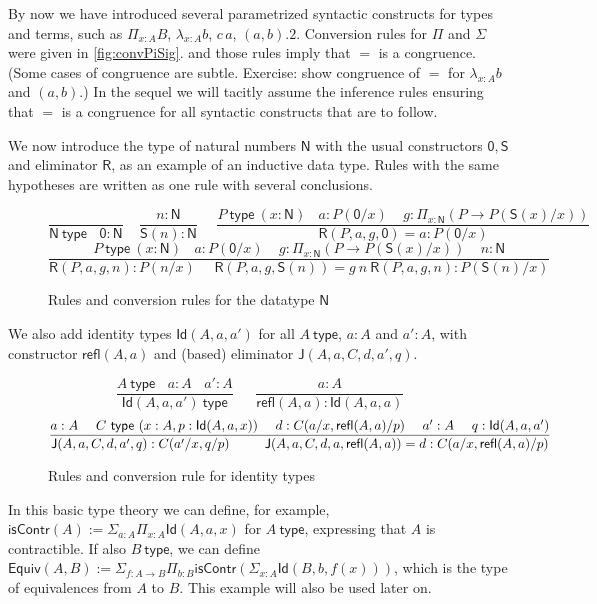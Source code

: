 \documentclass[11pt,a4paper]{article}
\theoremstyle{definition}
\newcommand{\Id}{\mathsf{Id}}
\newcommand{\NN}{\mathsf{N}}
\newcommand{\JJ}{\mathsf{J}}
\newcommand{\ZERO}{\mathsf{0}}
\newcommand{\SUCC}{\mathsf{S}}
\newcommand{\type}{\mathsf{type}}
\newcommand{\mylam}[3]{\lambda_{#1:#2}#3}
\newcommand{\mypi}[3]{\Pi_{#1:#2}#3}
\newcommand{\mysig}[3]{\Sigma_{#1:#2}#3}
\newcommand{\app}[2]{{#1\,#2}} %
\newcommand{\Sapp}[1]{\sapp{\SUCC}{#1}}
\newcommand{\sapp}[2]{{#1(#2)}} %
\newcommand{\Idapp}[3]{\sapp{\Id}{#1,#2,#3}}
\newcommand{\NRapp}[4]{\sapp{\RR}{#1,#2,#3,#4}}
\newcommand{\Rfapp}[2]{\sapp{\refl}{#1,#2}}
\newcommand{\Japp}[6]{\sapp{\JJ}{#1,#2,#3,#4,#5,#6}}
\newcommand{\RR}{\mathsf{R}}
\newcommand{\Equiv}{\mathsf{Equiv}}
\newcommand{\isContr}{\mathsf{isContr}}
\newcommand{\refl}{\mathsf{refl}}
\begin{document}
By now we have introduced several parametrized syntactic constructs
for types and terms, such as $\mypi{x}{A}{B}$,
$\mylam{x}{A}{b}$, $\app{c}{a}$, $(a,b).2$.
Conversion rules for $\Pi$ and $\Sigma$ were given in \cref{fig:convPiSig}.
and those rules imply that $=$ is a congruence.%
(Some cases of congruence are subtle. Exercise:
show congruence of $=$ for $\mylam{x}{A}{b}$ and $(a,b)$.)
In the sequel we will tacitly assume the inference rules
ensuring that $=$ is a congruence for all syntactic constructs
that are to follow.

We now introduce the type of natural numbers $\NN$ with
the usual constructors $\ZERO,\SUCC$ and eliminator $\RR$,
as an example of an inductive data type.
Rules with the same hypotheses are written as one rule with
several conclusions.

\begin{figure}[H]
  \caption{Rules and conversion rules for the datatype $\NN$}\label{fig:typeN}
$$
\frac{}{\NN~\type~~~~\ZERO:\NN}~~~~~
\frac{n:\NN}{\Sapp{n} : \NN}~~~~~~
\frac{P~\type~(x:\NN)~~~~a:P(\ZERO/x)~~~~~
g:\mypi{x}{\NN}{(P\to P(\Sapp{x}/x))}}
{\NRapp{P}{a}{g}{\ZERO} = a: P(\ZERO/x) }
$$
$$
\frac{P~\type~(x:\NN)~~~~a:P(\ZERO/x)~~~~~
g:\mypi{x}{\NN}{(P\to P(\Sapp{x}/x))}~~~~~n:\NN}
{\NRapp{P}{a}{g}{n}:P(n/x)~~~~~~\NRapp{P}{a}{g}{\Sapp{n}} = g~n~\NRapp{P}{a}{g}{n}: P(\Sapp{n}/x) }
$$
\end{figure}

We also add identity types $\Idapp{A}{a}{a'}$ for all $A~\type$,
$a:A$ and $a':A$, with constructor $\Rfapp{A}{a}$ and (based) eliminator
$\Japp{A}{a}{C}{d}{a'}{q}$.

\begin{figure}[H]
  \caption{Rules and conversion rule for identity types}\label{fig:typeId}
$$
\frac{A~\type ~~~~ a:A ~~~~ a':A}{\Idapp{A}{a}{a'}~\type}~~~~~~~
\frac{a:A}{\Rfapp{A}{a}:\Idapp{A}{a}{a}}
$$
$$
\frac{a:A~~~~C~\type~(x:A,p:\Idapp{A}{a}{x})~~~~d:C(a/x,\Rfapp{A}{a}/p)
~~~~a':A~~~~q:\Idapp{A}{a}{a'}}
{\Japp{A}{a}{C}{d}{a'}{q}: C(a'/x,q/p) ~~~~~~~~
 \Japp{A}{a}{C}{d}{a}{\Rfapp{A}{a}} = d : C(a/x,\Rfapp{A}{a}/p)}
\belowdisplayshortskip 0pt
$$
\end{figure}

In this basic type theory we can define, for example,
$\isContr(A) := \mysig{a}{A}{\mypi{x}{A}{\Id(A,a,x)}}$
for $A~\type$, expressing that $A$ is contractible.
If also $B~\type$, we can define $\Equiv(A,B) := 
\mysig{f}{A\to B}{\mypi{b}{B}{\isContr(\mysig{x}{A}{\Id(B,b,f(x))})}}$,
which is the type of equivalences from $A$ to $B$. This example
will also be used later on.
\end{document}

